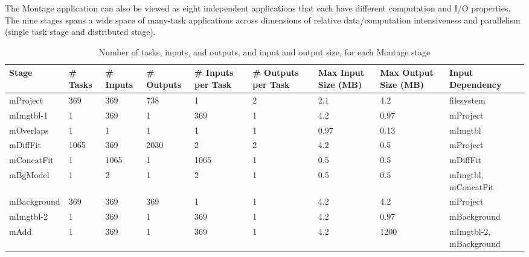 \documentclass{sig-alternate}
\newcommand{\zhaonote}[1]{{\textcolor{cyan}    { ***Zhao:      #1 }}}
\newcommand{\zhaonote}[1]{}
\begin{document}
The Montage application can also be viewed as eight independent applications that each have different computation and I/O properties. 
The nine stages spans a wide space of many-task applications across dimensions of relative data/computation intensiveness and parallelism (single task stage and distributed stage).

\begin{table}[ht]
\begin{center}
    \caption{Number of tasks, inputs, and outputs, and input and output size, for each Montage stage}
    \begin{scriptsize}
    \begin{tabular}{ | p{1.6cm} | p{1cm} | p{1.1cm} | p{1.35cm} | p{1.1cm} | p{1.35cm} | p{1.3cm} | p{1.55cm} | p{3.3cm} |}
    \hline
    Stage & \# Tasks & \# \mbox{Inputs} & \# \mbox{Outputs} & \# \mbox{Inputs} per Task & \# \mbox{Outputs} per Task & Max \mbox{Input} Size (MB) & Max \mbox{Output} Size (MB) & Input Dependency\\ \hline \hline
	mProject & 369 & 369 & 738 & 1 & 2 & 2.1 & 4.2 & filesystem \\ \hline
	mImgtbl-1 & 1 & 369 & 1 & 369 & 1 & 4.2 & 0.97 & mProject\\ \hline
	mOverlaps & 1 & 1 & 1 & 1 & 1 & 0.97 & 0.13 & mImgtbl\\ \hline
	mDiffFit & 1065 & 369 & 2030 & 2 & 2 & 4.2 & 0.5 & mProject\\ \hline
	mConcatFit & 1 & 1065 & 1 & 1065 & 1 & 0.5 & 0.5 & mDiffFit\\ \hline
	mBgModel & 1 & 2 & 1 & 2 & 1 & 0.5 & 0.5 & mImgtbl, mConcatFit\\ \hline
	mBackground & 369 & 369 & 369 & 1 & 1 & 4.2 & 4.2 & mProject\\ \hline
	mImgtbl-2 & 1 & 369 & 1 & 369 & 1 & 4.2 & 0.97 & mBackground\\ \hline
	mAdd  & 1 & 369 & 1 & 369 & 1 & 4.2 & 1200 & mImgtbl-2, mBackground\\ \hline
    \end{tabular}
    \end{scriptsize}
    \label{tb:montage-stats}
\end{center}   
\end{table} 
\end{document}
